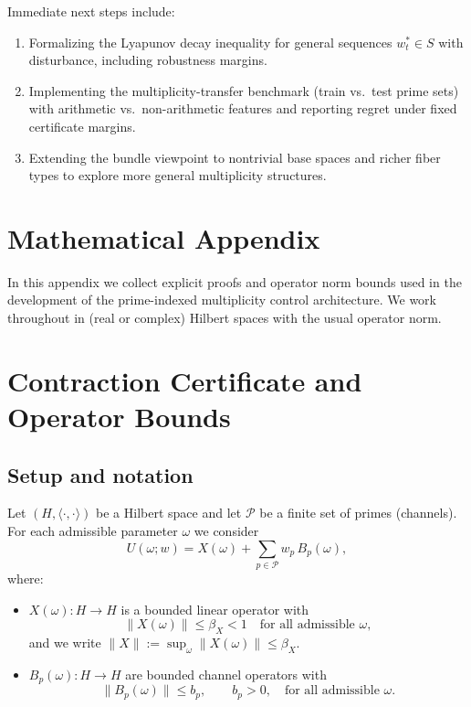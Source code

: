 \documentclass[11pt]{article}
\begin{document}
Immediate next steps include:
\begin{enumerate}
  \item Formalizing the Lyapunov decay inequality for general sequences $w_t^\ast\in S$ with disturbance, including robustness margins.
  \item Implementing the multiplicity-transfer benchmark (train vs.\ test prime sets) with arithmetic vs.\ non-arithmetic features and reporting regret under fixed certificate margins.
  \item Extending the bundle viewpoint to nontrivial base spaces and richer fiber types to explore more general multiplicity structures.
\end{enumerate}

\appendix
\section*{Mathematical Appendix}

In this appendix we collect explicit proofs and operator norm bounds used in the development of the prime-indexed multiplicity control architecture. We work throughout in (real or complex) Hilbert spaces with the usual operator norm.

\section{Contraction Certificate and Operator Bounds}

\subsection{Setup and notation}

Let $(H,\langle\cdot,\cdot\rangle)$ be a Hilbert space and let $\mathcal P$ be a finite set of primes (channels). For each admissible parameter $\omega$ we consider
\[
U(\omega;w) = X(\omega) + \sum_{p\in\mathcal P} w_p\,B_p(\omega),
\]
where:
\begin{itemize}
  \item $X(\omega):H\to H$ is a bounded linear operator with
  \begin{equation}
    \|X(\omega)\| \le \beta_X < 1
    \quad\text{for all admissible }\omega,
    \label{eq:X-bound}
  \end{equation}
  and we write $\|X\|:=\sup_\omega \|X(\omega)\|\le\beta_X$.
  \item $B_p(\omega):H\to H$ are bounded channel operators with
  \begin{equation}
    \|B_p(\omega)\| \le b_p,\qquad b_p>0,
    \quad\text{for all admissible }\omega.
    \label{eq:Bp-bound}
  \end{equation}
\end{itemize}
\end{document}
